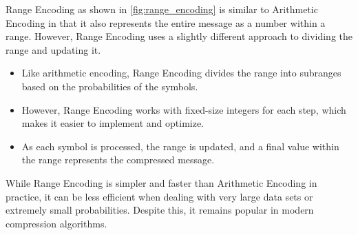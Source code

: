     Range Encoding as shown in \autoref{fig:range_encoding} is similar to Arithmetic Encoding in that it also represents the entire message as a number within a range. However, Range Encoding uses a slightly different approach to dividing the range and updating it.

    \begin{itemize}
        \item Like arithmetic encoding, Range Encoding divides the range into subranges based on the probabilities of the symbols.
        \item However, Range Encoding works with fixed-size integers for each step, which makes it easier to implement and optimize.
        \item As each symbol is processed, the range is updated, and a final value within the range represents the compressed message.
    \end{itemize}

    While Range Encoding is simpler and faster than Arithmetic Encoding in practice, it can be less efficient when dealing with very large data sets or extremely small probabilities. Despite this, it remains popular in modern compression algorithms.




